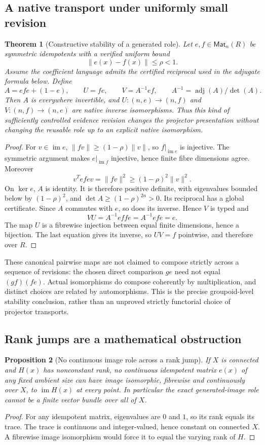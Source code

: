 \documentclass[11pt]{article}
\newtheorem{theorem}{Theorem}[section]
\newtheorem{proposition}[theorem]{Proposition}
\theoremstyle{definition}
\theoremstyle{remark}
\newcommand{\Mat}{\mathsf{Mat}}
\newcommand{\im}{\operatorname{im}}
\begin{document}
\subsection{A native transport under uniformly small revision}
\begin{theorem}[Constructive stability of a generated role]\label{m-thm:stable}
Let $e,f\in\Mat_n(R)$ be symmetric idempotents with a verified uniform bound
\[
                           \|e(x)-f(x)\|\le\rho<1.
\]
Assume the coefficient language admits the certified reciprocal used in the adjugate formula below. Define
\[
 A=efe+(1-e),\qquad U=fe,\qquad V=A^{-1}ef,
 \qquad A^{-1}=\operatorname{adj}(A)/\det(A).
\]
Then $A$ is everywhere invertible, and $U:(n,e)\to(n,f)$ and $V:(n,f)\to(n,e)$ are native inverse isomorphisms. Thus this kind of sufficiently controlled evidence revision changes the projector presentation without changing the reusable role up to an explicit native isomorphism.
\end{theorem}
\begin{proof}
For $v\in\im e$, $\|fv\|\ge(1-\rho)\|v\|$, so $f|_{\im e}$ is injective. The symmetric argument makes $e|_{\im f}$ injective, hence finite fibre dimensions agree. Moreover
\[
 v^Tefe v=\|fv\|^2\ge(1-\rho)^2\|v\|^2.
\]
On $\ker e$, $A$ is identity. It is therefore positive definite, with eigenvalues bounded below by $(1-\rho)^2$, and $\det A\ge(1-\rho)^{2n}>0$. Its reciprocal has a global certificate. Since $A$ commutes with $e$, so does its inverse. Hence $V$ is typed and
\[
 VU=A^{-1}ef fe=A^{-1}efe=e.
\]
The map $U$ is a fibrewise injection between equal finite dimensions, hence a bijection. The last equation gives its inverse, so $UV=f$ pointwise, and therefore over $R$.
\end{proof}

These canonical pairwise maps are not claimed to compose strictly across a sequence of revisions: the chosen direct comparison $ge$ need not equal $(gf)(fe)$. Actual isomorphisms do compose coherently by multiplication, and distinct choices are related by automorphisms. This is the precise groupoid-level stability conclusion, rather than an unproved strictly functorial choice of projector transports.

\subsection{Rank jumps are a mathematical obstruction}
\begin{proposition}[No continuous image role across a rank jump]\label{m-prop:jump}
If $X$ is connected and $H(x)$ has nonconstant rank, no continuous idempotent matrix $e(x)$ of any fixed ambient size can have image isomorphic, fibrewise and continuously over $X$, to $\im H(x)$ at every point. In particular the exact generated-image role cannot be a finite vector bundle over all of $X$.
\end{proposition}
\begin{proof}
For any idempotent matrix, eigenvalues are $0$ and $1$, so its rank equals its trace. The trace is continuous and integer-valued, hence constant on connected $X$. A fibrewise image isomorphism would force it to equal the varying rank of $H$.
\end{proof}
\end{document}
